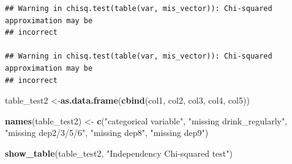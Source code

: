\documentclass[
]{article}
\newenvironment{Shaded}{\begin{snugshade}}{\end{snugshade}}
\newcommand{\AttributeTok}[1]{\textcolor[rgb]{0.13,0.29,0.53}{#1}}
\newcommand{\FunctionTok}[1]{\textcolor[rgb]{0.13,0.29,0.53}{\textbf{#1}}}
\newcommand{\NormalTok}[1]{#1}
\newcommand{\OtherTok}[1]{\textcolor[rgb]{0.56,0.35,0.01}{#1}}
\newcommand{\SpecialCharTok}[1]{\textcolor[rgb]{0.81,0.36,0.00}{\textbf{#1}}}
\newcommand{\StringTok}[1]{\textcolor[rgb]{0.31,0.60,0.02}{#1}}
\begin{document}
\begin{Shaded}
\end{Shaded}

\begin{verbatim}
## Warning in chisq.test(table(var, mis_vector)): Chi-squared approximation may be
## incorrect

## Warning in chisq.test(table(var, mis_vector)): Chi-squared approximation may be
## incorrect
\end{verbatim}

\begin{Shaded}
\begin{Highlighting}[]
\NormalTok{table\_test2 }\OtherTok{\textless{}{-}}\FunctionTok{as.data.frame}\NormalTok{(}\FunctionTok{cbind}\NormalTok{(col1, col2, col3, col4, col5))}

\FunctionTok{names}\NormalTok{(table\_test2) }\OtherTok{\textless{}{-}} \FunctionTok{c}\NormalTok{(}\StringTok{"categorical variable"}\NormalTok{, }
    \StringTok{"missing drink\_regularly"}\NormalTok{,}
    \StringTok{"missing dep2/3/5/6"}\NormalTok{,}
    \StringTok{"missing dep8"}\NormalTok{,}
    \StringTok{"missing dep9"}\NormalTok{)}

\FunctionTok{show\_table}\NormalTok{(table\_test2, }\StringTok{"Independency Chi{-}squared test"}\NormalTok{)}
\end{Highlighting}
\end{Shaded}
\end{document}

